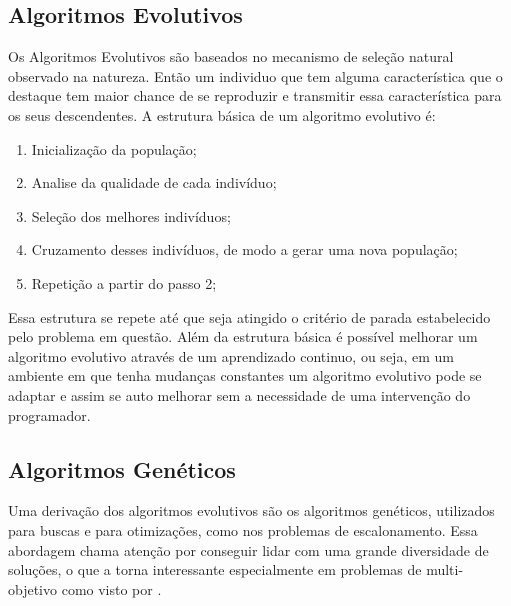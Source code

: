     \subsection{Algoritmos Evolutivos}
        Os Algoritmos Evolutivos são baseados no mecanismo de seleção natural observado na natureza. Então um individuo que tem alguma característica que o destaque tem maior chance de se reproduzir e transmitir essa característica para os seus descendentes.\newline
        A estrutura básica de um algoritmo evolutivo é:
        \begin{enumerate}
            \item Inicialização da população;
            \item Analise da qualidade de cada indivíduo;
            \item Seleção dos melhores indivíduos;
            \item Cruzamento desses indivíduos, de modo a gerar uma nova população;
            \item Repetição a partir do passo 2;
        \end{enumerate}
        Essa estrutura se repete até que seja atingido o critério de parada estabelecido pelo problema em questão.\newline
        Além da estrutura básica é possível melhorar um algoritmo evolutivo através de um aprendizado continuo, ou seja, em um ambiente em que tenha mudanças constantes um algoritmo evolutivo pode se adaptar e assim se auto melhorar sem a necessidade de uma intervenção do programador.


    \subsection{Algoritmos Genéticos}
        Uma derivação dos algoritmos evolutivos são os algoritmos genéticos, utilizados para buscas e para otimizações, como nos problemas de escalonamento. Essa abordagem chama atenção por conseguir lidar com uma grande diversidade de soluções, o que a torna interessante especialmente em problemas de multi-objetivo como visto por \cite{Bagchi1999}.\newline
        
